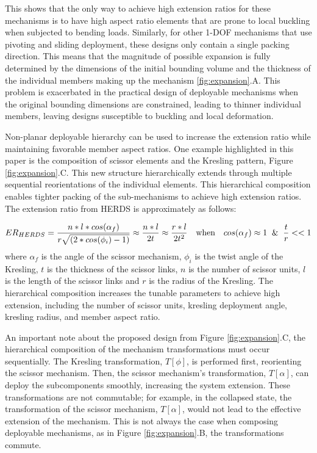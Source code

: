 This shows that the only way to achieve high extension ratios for these mechanisms is to have high aspect ratio elements that are prone to local buckling when subjected to bending loads. Similarly, for other 1-DOF mechanisms that use pivoting and sliding deployment, these designs only contain a single packing direction. This means that the magnitude of possible expansion is fully determined by the dimensions of the initial bounding volume and the thickness of the individual members making up the mechanism \ref{fig:expansion}.A. This problem is exacerbated in the practical design of deployable mechanisms when the original bounding dimensions are constrained, leading to thinner individual members, leaving designs susceptible to buckling and local deformation.

Non-planar {deployable }hierarchy can be used to increase the extension ratio while maintaining favorable member aspect ratios. One example highlighted in this paper is the composition of scissor elements and the Kresling pattern, Figure \ref{fig:expansion}.C. This new structure hierarchically extends through multiple sequential reorientations of the individual elements. This hierarchical composition enables tighter packing of the sub-mechanisms to achieve high extension ratios. The extension ratio from HERDS is approximately as follows:

\begin{equation}
    ER_{HERDS} = \frac{n*l*cos(\alpha_f)}{r\sqrt{(2*cos(\phi_i)-1)}} \approx \frac{n*l}{2t} \approx \frac{r*l}{2t^2} \quad \text{when}\quad cos(\alpha_f) \approx 1 \And \frac{t}{r} << 1
\end{equation}
where $\alpha_f$ is the angle of the scissor mechanism, $\phi_i$ is the twist angle of the Kresling, $t$ is the thickness of the scissor links, $n$ is the number of scissor units, $l$ is the length of the scissor links and $r$ is the radius of the Kresling. The hierarchical composition increases the tunable parameters to achieve high extension, including the number of scissor units, kresling deployment angle, kresling radius, and member aspect ratio. 

An important note about the proposed design from Figure \ref{fig:expansion}.C, the hierarchical composition of the mechanism transformations must occur sequentially. The Kresling transformation, $T[\phi]$, is performed first, reorienting the scissor mechanism. Then, the scissor mechanism's transformation, $T[\alpha]$, can deploy the subcomponents smoothly, increasing the system extension. These transformations are not commutable; for example, in the collapsed state, the transformation of the scissor mechanism, $T[\alpha]$, would not lead to the effective extension of the mechanism. This is not always the case when composing deployable mechanisms, as in Figure \ref{fig:expansion}.B, the transformations commute.

